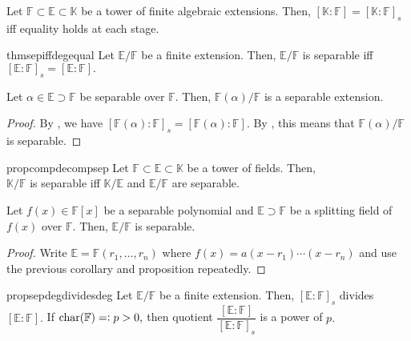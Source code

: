 \begin{cor}
    Let $\mathbb{F} \subset \mathbb{E} \subset \mathbb{K}$ be a tower of finite algebraic extensions. Then, $[\mathbb{K} : \mathbb{F}] = [\mathbb{K} : \mathbb{F}]_s$ iff equality holds at each stage.
\end{cor}

\begin{restatable}[]{thm}{sepiffdegequal}
\label{thm:sepiffdegequal}
    Let $\mathbb{E}/\mathbb{F}$ be a finite extension. Then, $\mathbb{E}/\mathbb{F}$ is separable iff $[\mathbb{E} : \mathbb{F}]_s = [\mathbb{E} : \mathbb{F}].$ \hfill\hyperref[thm:sepiffdegequal2]{\downsym}
\end{restatable}

\begin{cor} \label{cor:adjoiningsepissep}
    Let $\alpha \in \mathbb{E} \supset \mathbb{F}$ be separable over $\mathbb{F}.$ Then, $\mathbb{F}(\alpha)/\mathbb{F}$ is a separable extension.
\end{cor}
\begin{proof}
    By , we have $[\mathbb{F}(\alpha) : \mathbb{F}]_s = [\mathbb{F}(\alpha) : \mathbb{F}].$ By , this means that $\mathbb{F}(\alpha)/\mathbb{F}$ is separable.
\end{proof}

\begin{restatable}[]{prop}{compdecompsep}
\label{prop:compdecompsep}
    Let $\mathbb{F} \subset \mathbb{E} \subset \mathbb{K}$ be a tower of fields. Then,\\
    $\mathbb{K}/\mathbb{F}$ is separable iff $\mathbb{K}/\mathbb{E}$ and $\mathbb{E}/\mathbb{F}$ are separable. \hfill\hyperref[prop:compdecompsep2]{\downsym}
\end{restatable}

\begin{cor}
    Let $f(x) \in \mathbb{F}[x]$ be a separable polynomial and $\mathbb{E} \supset \mathbb{F}$ be a splitting field of $f(x)$ over $\mathbb{F}.$ Then, $\mathbb{E}/\mathbb{F}$ is separable.
\end{cor}
\begin{proof}
    Write $\mathbb{E} = \mathbb{F}(r_1, \ldots, r_n)$ where $f(x) = a(x - r_1) \cdots (x - r_n)$ and use the previous corollary and proposition repeatedly.
\end{proof}

\begin{restatable}[]{prop}{sepdegdividesdeg}
\label{prop:sepdegdividesdeg}
    Let $\mathbb{E}/\mathbb{F}$ be a finite extension. Then, $[\mathbb{E} : \mathbb{F}]_s$ divides $[\mathbb{E} : \mathbb{F}].$ If $\operatorname{char}(\mathbb{F}) =\vcentcolon p > 0,$ then quotient $\dfrac{[\mathbb{E} : \mathbb{F}]}{[\mathbb{E} : \mathbb{F}]_s}$ is a power of $p.$ \hfill\hyperref[prop:sepdegdividesdeg2]{\downsym}
\end{restatable}
